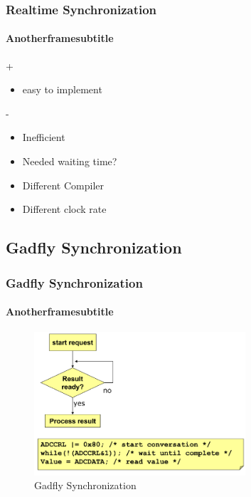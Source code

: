 \begin{frame}
    \frametitle{Realtime Synchronization}
    \framesubtitle{Anotherframesubtitle}
        \begin{exampleblock}{+}
        \begin{itemize}
			\item easy to implement         
    	\end{itemize}
    \end{exampleblock}
    \begin{alertblock}{-}
        \begin{itemize}
			\item Inefficient        
        	\item Needed waiting time?
        	\item Different Compiler
        	\item Different clock rate
    	\end{itemize}
    \end{alertblock}
\end{frame}

\subsection{Gadfly Synchronization}
\begin{frame}
    \frametitle{Gadfly Synchronization}
    \framesubtitle{Anotherframesubtitle}
    \begin{figure}
        \includegraphics[width=0.7\textwidth]{fig/gadfly.png}
        \caption{Gadfly Synchronization}
    \end{figure}
        
\end{frame}

